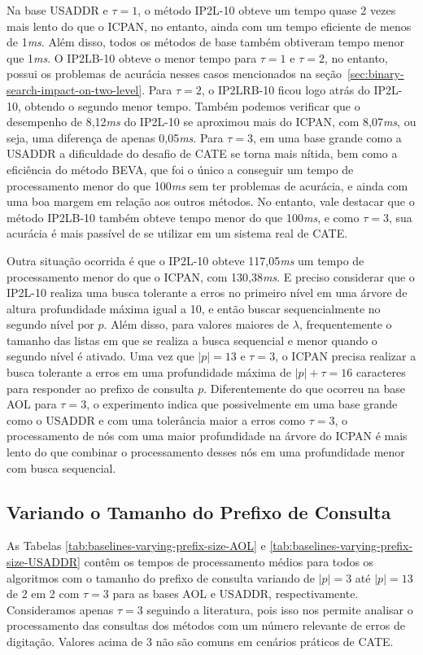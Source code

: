 Na base USADDR e $\tau=1$, o método IP2L-10 obteve um tempo quase 2 vezes mais lento do que o ICPAN, no entanto, ainda com um tempo eficiente de menos de 1\textit{ms}. Além disso, todos os métodos de base também obtiveram tempo menor que 1\textit{ms}. O IP2LB-10 obteve o menor tempo para $\tau=1$ e $\tau=2$, no entanto, possui os problemas de acurácia nesses casos mencionados na seção~\ref{sec:binary-search-impact-on-two-level}. Para $\tau=2$, o IP2LRB-10 ficou logo atrás do IP2L-10, obtendo o segundo menor tempo. Também podemos verificar que o desempenho de 8,12\textit{ms} do IP2L-10 se aproximou mais do ICPAN, com 8,07\textit{ms}, ou seja, uma diferença de apenas 0,05\textit{ms}. Para $\tau=3$, em uma base grande como a USADDR a dificuldade do desafio de CATE se torna mais nítida, bem como a eficiência do método BEVA, que foi o único a conseguir um tempo de processamento menor do que 100\textit{ms} sem ter problemas de acurácia, e ainda com uma boa margem em relação aos outros métodos. No entanto, vale destacar que o método IP2LB-10 também obteve tempo menor do que 100\textit{ms}, e como $\tau=3$, sua acurácia é mais passível de se utilizar em um sistema real de CATE. 

Outra situação ocorrida é que o IP2L-10 obteve 117,05\textit{ms} um tempo de processamento menor do que o ICPAN, com 130,38\textit{ms}. E preciso considerar que o IP2L-10 realiza uma busca tolerante a erros no primeiro nível em uma árvore de altura profundidade máxima igual a 10, e então buscar sequencialmente no segundo nível por $p$. Além disso, para valores maiores de $\lambda$, frequentemente o tamanho das listas em que se realiza a busca sequencial e menor quando o segundo nível é ativado. Uma vez que $|p|=13$ e $\tau=3$, o ICPAN precisa realizar a busca tolerante a erros em uma profundidade máxima de $|p| + \tau = 16$ caracteres para responder ao prefixo de consulta $p$. Diferentemente do que ocorreu na base AOL para $\tau=3$, o experimento indica que possivelmente em uma base grande como o USADDR e com uma tolerância maior a erros como $\tau=3$, o processamento de nós com uma maior profundidade na árvore do ICPAN é mais lento do que combinar o processamento desses nós em uma profundidade menor com busca sequencial.


\subsection{Variando o Tamanho do Prefixo de Consulta}

As Tabelas \ref{tab:baselines-varying-prefix-size-AOL} e \ref{tab:baselines-varying-prefix-size-USADDR} contêm os tempos de processamento médios para todos os algoritmos com o tamanho do prefixo de consulta variando de $|p|=3$ até $|p|=13$ de 2 em 2 com $\tau=3$ para as bases AOL e USADDR, respectivamente. Consideramos apenas $\tau=3$ seguindo a literatura, pois isso nos permite analisar o processamento das consultas dos métodos com um número relevante de erros de digitação. Valores acima de 3 não são comuns em cenários práticos de CATE.

